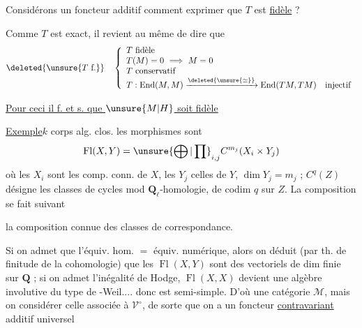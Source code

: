 Considérons un foncteur additif
comment exprimer que $T$ est \uline{fidèle} ?

Comme $T$ est exact, il revient au même de dire que
\[
\deleted{\unsure{T\text{ f.}}}\quad
\left\{\begin{array}{l}
T\text{ fidèle}\\
T(M)=0\ \Longrightarrow\ M=0\\
T\text{ conservatif}\\
T:\operatorname{End}(M,M)\xrightarrow{\deleted{\unsure{\simeq}}}\operatorname{End}(TM,TM)\quad\text{injectif}
\end{array}\right.
\]

\uline{Pour ceci il f. et s. que $\unsure{M|H}$ soit fidèle}


\uline{Exemple}\qquad $k$ corps alg. clos.
les morphismes sont
\[
\operatorname{Fl}(X,Y)=\unsure{\bigoplus|\prod}_{i,j} C^{m_j}(X_i\times Y_j)
\]
où les $X_i$ sont les comp. conn. de $X$, les $Y_j$ celles de $Y$, $\dim Y_j=m_j$ ; $C^q(Z)$ désigne les classes de cycles mod $\mathbf Q_\ell$-homologie, de codim $q$ sur $Z$. La composition se fait suivant

la composition connue des classes de correspondance.

Si on admet que l'équiv. hom. $=$ équiv. numérique, alors on déduit (par th. de finitude de la cohomologie) que les $\operatorname{Fl}(X,Y)$ sont des  vectoriels de dim finie sur $\mathbf Q$ ; si on admet l'inégalité de Hodge,  $\operatorname{Fl}(X,X)$ devient une algèbre involutive du type de -Weil.... donc est semi-simple. D'où une catégorie  $\mathcal M$, mais on  considérer celle associée à $\mathcal V^\circ$, de sorte que on a un foncteur \uline{contravariant} additif universel

